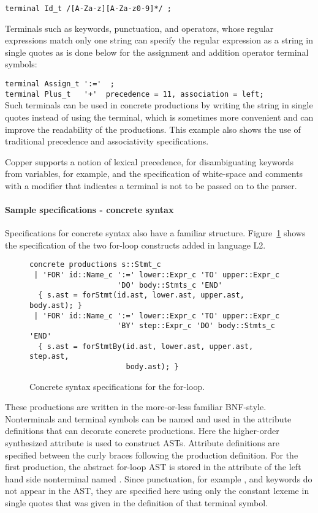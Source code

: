 \noindent
\verb!terminal Id_t /[A-Za-z][A-Za-z0-9]*/ ;!

Terminals such as keywords, punctuation, and operators, whose regular
expressions match only one string can specify the regular expression
as a string in single quotes as is done below for the assignment and
addition operator terminal symbols:

\noindent
\verb!terminal Assign_t ':='  ;! \\
\verb!terminal Plus_t   '+'  precedence = 11, association = left;! \\
%
Such terminals can be used in concrete productions by writing the
string in single quotes instead of using the terminal, which is
sometimes more convenient and can improve the readability of the
productions. 
%
This example also shows the use of traditional precedence and
associativity specifications.

Copper supports a notion of lexical precedence, for disambiguating
keywords from variables, for example, and the specification of
white-space and comments with a  modifier that indicates
a terminal is not to be passed on to the parser.


\paragraph{Sample specifications - concrete syntax}
Specifications for concrete syntax also have a familiar structure.
Figure~\ref{silver:fig:concrete} shows the specification of the two
for-loop constructs added in language L2.
\begin{figure}
\begin{verbatim}
concrete productions s::Stmt_c
 | 'FOR' id::Name_c ':=' lower::Expr_c 'TO' upper::Expr_c
                    'DO' body::Stmts_c 'END'         
  { s.ast = forStmt(id.ast, lower.ast, upper.ast, body.ast); }
 | 'FOR' id::Name_c ':=' lower::Expr_c 'TO' upper::Expr_c
                    'BY' step::Expr_c 'DO' body::Stmts_c 'END' 
  { s.ast = forStmtBy(id.ast, lower.ast, upper.ast, step.ast, 
                      body.ast); }
\end{verbatim}
\caption{Concrete syntax specifications for the for-loop.}
\label{silver:fig:concrete}
\end{figure}
These productions are written in the more-or-less familiar BNF-style.
Nonterminals and terminal symbols can be named and used in the
attribute definitions that can decorate concrete productions.  Here the
higher-order synthesized  attribute is used to construct
ASTs.  Attribute definitions are specified between the curly braces
following the production definition.
%
For the first production, the abstract for-loop AST is stored
in the  attribute of the left hand side nonterminal named
. Since punctuation, for example \code{:=}, and keywords do
not appear in the AST, they are specified here using only the constant
lexeme in single quotes that was given in the definition of that
terminal symbol.

